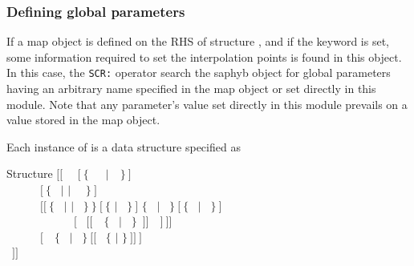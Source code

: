 \subsubsection{Defining global parameters}\label{sect:descints}

\vskip -0.5cm

If a {\sc map} object is defined on the RHS of structure , and if the  keyword is set, some information required to set the interpolation points is found in this object.
In this case, the {\tt SCR:} operator search the {\sc saphyb} object for global parameters  having an arbitrary name specified in the {\sc map} object or set directly in this module.
Note that any parameter's value set directly in this module prevails on a value stored in the {\sc map} object.

Each instance of  is a data structure specified as

\begin{DataStructure}{Structure }
$[[$~ ~$[~\{$~~~$|$~~$\}~]$ \\
~~~~~~$[~\{$~ $|$  $|$ ~~$\}~]$ \\
~~~~~~$[[~\{$~ $|$  $|$ ~$\}~\}~[~\{$  $|$ ~$\}~]$  $\{$~ $|$ ~$\}~[~\{$~ $|$ ~$\}~]$ \\
~~~~~~~~~~~~$[$~ $[[$~~$\{$~ $|$ ~$\}$~$]]$~~$]~]]$  \\
~~~~~~$[$~~$\{$~ $|$ ~$\}~[[$~ $\{$  $|$ \moc{*} $\}~]]~]$ \\
~$]]$
\end{DataStructure}


